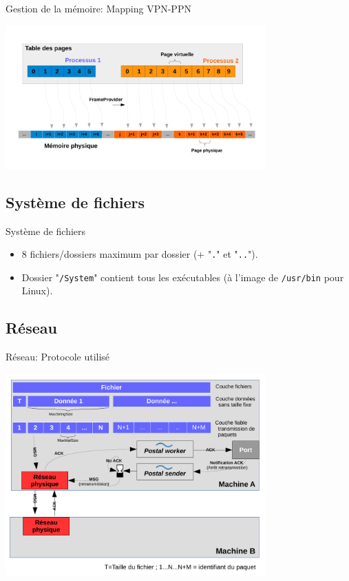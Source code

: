 \documentclass{beamer}
\begin{document}
\begin{frame}{Gestion de la mémoire: Mapping VPN-PPN}
	 \begin{center}
			\includegraphics[width=10cm]{schema_memoire.pdf}
	\end{center}
\end{frame}

\subsection{Système de fichiers}
\begin{frame}{Système de fichiers}
    \begin{itemize}
		\item 8 fichiers/dossiers maximum par dossier (+ "\texttt{.}" et "\texttt{..}").
		\item Dossier "\texttt{/System}" contient tous les exécutables (à l'image de \texttt{/usr/bin} pour Linux).
    \end{itemize}
\end{frame}

\subsection{Réseau}

\begin{frame}{Réseau: Protocole utilisé}
        \begin{center}
			\includegraphics[width=10cm]{schema_reseau.pdf}
		\end{center}
\end{frame}
\end{document}
